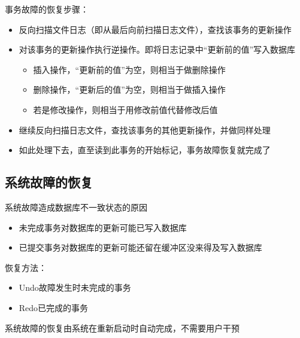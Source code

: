 事务故障的恢复步骤：
\begin{itemize}
    \item 反向扫描文件日志（即从最后向前扫描日志文件），查找该事务的更新操作
    \item 对该事务的更新操作执行逆操作。即将日志记录中“更新前的值”写入数据库
    \begin{itemize}
        \item 插入操作，“更新前的值”为空，则相当于做删除操作
        \item 删除操作，“更新后的值”为空，则相当于做插入操作
        \item 若是修改操作，则相当于用修改前值代替修改后值 
    \end{itemize}
    \item 继续反向扫描日志文件，查找该事务的其他更新操作，并做同样处理
    \item 如此处理下去，直至读到此事务的开始标记，事务故障恢复就完成了
\end{itemize}

\subsection{系统故障的恢复}
系统故障造成数据库不一致状态的原因
\begin{itemize}
    \item 未完成事务对数据库的更新可能已写入数据库
    \item 已提交事务对数据库的更新可能还留在缓冲区没来得及写入数据库
\end{itemize}

恢复方法：
\vspace{-0.8em}
\begin{multicols}{2}
    \begin{itemize}
        \item Undo故障发生时未完成的事务
        \item Redo已完成的事务
    \end{itemize}
\end{multicols}
\vspace{-1em}

系统故障的恢复由系统在重新启动时自动完成，不需要用户干预

